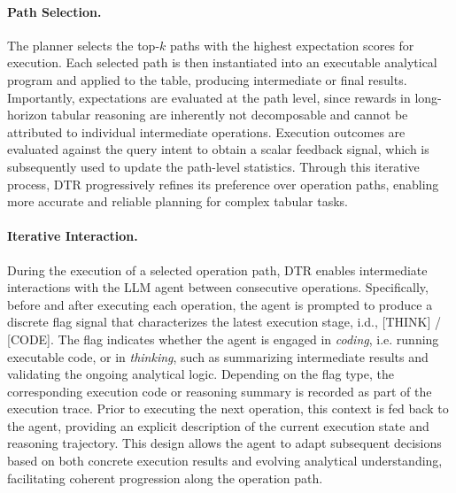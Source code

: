 



\paragraph{Path Selection.}

The planner selects the top-$k$ paths with the highest expectation scores for execution. Each selected path is then instantiated into an executable analytical program and applied to the table, producing intermediate or final results. Importantly, expectations are evaluated at the path level, since rewards in long-horizon tabular reasoning are inherently not decomposable and cannot be attributed to individual intermediate operations. 
Execution outcomes are evaluated against the query intent to obtain a scalar feedback signal, which is subsequently used to update the path-level statistics. Through this iterative process, DTR progressively refines its preference over operation paths, enabling more accurate and reliable planning for complex tabular tasks.

\paragraph{Iterative Interaction.} During the execution of a selected operation path, DTR enables intermediate interactions with the LLM agent between consecutive operations. Specifically, before and after executing each operation, the agent is prompted to produce a discrete flag signal that characterizes the latest execution stage, i.d., [THINK] / [CODE]. The flag indicates whether the agent is engaged in \emph{coding}, i.e. running executable code, or in \emph{thinking}, such as summarizing intermediate results and validating the ongoing analytical logic. Depending on the flag type, the corresponding execution code or reasoning summary is recorded as part of the execution trace. Prior to executing the next operation, this context is fed back to the agent, providing an explicit description of the current execution state and reasoning trajectory. This design allows the agent to adapt subsequent decisions based on both concrete execution results and evolving analytical understanding, facilitating coherent progression along the operation path.



